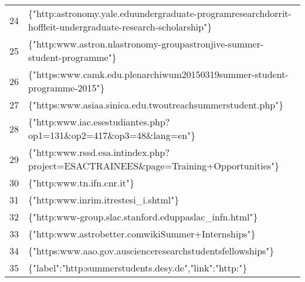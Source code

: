 \documentclass[a4paper,10pt]{article}
\begin{document}
\begin{table}[]
\begin{tabular}{ll}
24 & \{"http:\/\/astronomy.yale.edu\/undergraduate-program\/research\/dorrit-hoffleit-undergraduate-research-scholarship"\}                                                                     \\
25 & \{"http:\/\/www.astron.nl\/astronomy-group\/astronjive-summer-student-programme"\}                                                                                                         \\
26 & \{"https:\/\/www.camk.edu.pl\/en\/archiwum\/2015\/03\/19\/summer-student-programme-2015\/"\}                                                                                               \\
27 & \{"https:\/\/www.asiaa.sinica.edu.tw\/outreach\/summerstudent.php"\}                                                                                                                       \\
28 & \{"http:\/\/www.iac.es\/estudiantes.php?op1=131\&op2=417\&op3=48\&lang=en"\}                                                                                                               \\
29 & \{"http:\/\/www.rssd.esa.int\/index.php?project=ESACTRAINEES\&page=Training+Opportunities"\}                                                                                               \\
30 & \{"http:\/\/www.tn.ifn.cnr.it\/"\}                                                                                                                                                         \\
31 & \{"http:\/\/www.inrim.it\/res\/tesi\_i.shtml"\}                                                                                                                                            \\
32 & \{"http:\/\/www-group.slac.stanford.edu\/ppa\/slac\_infn.html"\}                                                                                                                           \\
33 & \{"http:\/\/www.astrobetter.com\/wiki\/Summer+Internships"\}                                                                                                                               \\
34 & \{"https:\/\/www.aao.gov.au\/science\/research\/students\/fellowships"\}                                                                                                                   \\
35 & \{"label":"http:\/\/summerstudents.desy.de\/","link":"http:\/\/"\}                                                                                                                                               \\

\end{tabular}
\end{table}
\end{document}
